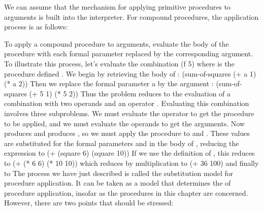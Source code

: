 We can assume that the mechanism for applying primitive procedures to arguments is built into the interpreter.
For compound procedures, the application process is as follows:
\startitemize[1]
\item To apply a compound procedure to arguments,
      evaluate the body of the procedure with each formal parameter replaced by the corresponding argument.
\stopitemize
To illustrate this process, let's evaluate the combination
\startcode
(f 5)
\stopcode
where  is the procedure defined .
We begin by retrieving the body of :
\startcode
(sum-of-squares (+ a 1) (* a 2))
\stopcode
Then we replace the formal parameter a by the argument :
\startcode
(sum-of-squares (+ 5 1) (* 5 2))
\stopcode
Thus the problem reduces to the evaluation of a combination with two operands and an operator .
Evaluating this combination involves three subproblems.
We must evaluate the operator to get the procedure to be applied,
and we must evaluate the operands to get the arguments.
Now  produces  and  produces ,
so we must apply the  procedure to  and .
These values are substituted for the formal parameters  and  in the body of ,
reducing the expression to
\startcode
(+ (square 6) (square 10))
\stopcode
If we use the definition of , this reduces to
\startcode
(+ (* 6 6) (* 10 10))
\stopcode
which reduces by multiplication to
\startcode
(+ 36 100)
\stopcode
and finally to
\stopcode
The process we have just described is called the substitution model for procedure application.
It can be taken as a model that determines the  of procedure application,
insofar as the procedures in this chapter are concerned.
However, there are two points that should be stressed:

